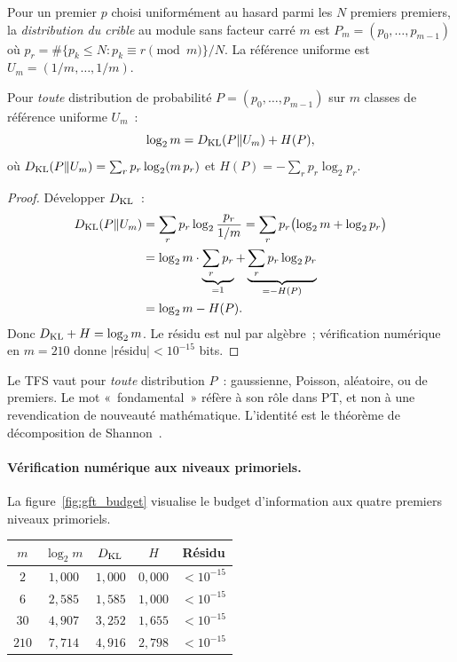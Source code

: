 \documentclass[12pt,a4paper]{article}
\begin{document}
\begin{definition}
Pour un premier $p$ choisi uniformément au hasard parmi les $N$
premiers premiers, la \emph{distribution du crible} au module sans
facteur carré $m$ est $P_m = (p_0, \ldots, p_{m-1})$ où
$p_r = \#\{p_k \leq N : p_k \equiv r \pmod m\}/N$.
La référence uniforme est $U_m = (1/m, \ldots, 1/m)$.
\end{definition}

\mID
\begin{idbox}
\label{id:gft}
Pour \emph{toute} distribution de probabilité
$P = (p_0, \ldots, p_{m-1})$ sur $m$ classes de référence uniforme
$U_m$~:
\begin{equation}
  \log_2 m = D_{\mathrm{KL}}(P \| U_m) + H(P),
  \label{eq:gft}
\end{equation}
où $D_{\mathrm{KL}}(P\|U_m) = \sum_r p_r \log_2(m\, p_r)$ et
$H(P) = -\sum_r p_r \log_2 p_r$.

\begin{proof}
Développer $D_{\mathrm{KL}}$~:
\begin{align*}
  D_{\mathrm{KL}}(P\|U_m)
  &= \sum_r p_r \log_2\frac{p_r}{1/m}
   = \sum_r p_r \bigl(\log_2 m + \log_2 p_r\bigr) \\
  &= \log_2 m \cdot \underbrace{\sum_r p_r}_{=1}
   + \underbrace{\sum_r p_r \log_2 p_r}_{=-H(P)} \\
  &= \log_2 m - H(P).
\end{align*}
Donc $D_{\mathrm{KL}} + H = \log_2 m$. Le résidu est nul par algèbre~;
vérification numérique en $m = 210$ donne
$|\text{résidu}| < 10^{-15}$ bits.
\end{proof}
\end{idbox}

\begin{remarque}[Universalité]
Le TFS vaut pour \emph{toute} distribution $P$~: gaussienne,
Poisson, aléatoire, ou de premiers. Le mot «~fondamental~» réfère à
son rôle dans PT, et non à une revendication de nouveauté
mathématique. L'identité est le théorème de décomposition de
Shannon~\cite{Shannon1948}.
\end{remarque}

\paragraph{Vérification numérique aux niveaux primoriels.}
La figure~\ref{fig:gft_budget} visualise le budget d'information aux
quatre premiers niveaux primoriels.

\begin{center}
\begin{tabular}{ccccc}
\toprule
$m$ & $\log_2 m$ & $D_{\mathrm{KL}}$ & $H$ & Résidu \\
\midrule
$2$   & $1{,}000$ & $1{,}000$ & $0{,}000$ & $< 10^{-15}$ \\
$6$   & $2{,}585$ & $1{,}585$ & $1{,}000$ & $< 10^{-15}$ \\
$30$  & $4{,}907$ & $3{,}252$ & $1{,}655$ & $< 10^{-15}$ \\
$210$ & $7{,}714$ & $4{,}916$ & $2{,}798$ & $< 10^{-15}$ \\
\bottomrule
\end{tabular}
\end{center}
\end{document}
